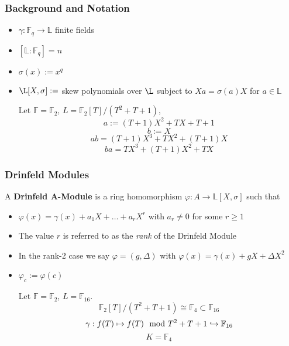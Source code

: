 \documentclass{beamer}
\newcommand{\F}{\mathbb{F}}
\newcommand{\f}{\mathbb{F}}
\begin{document}
\begin{frame}
\frametitle{Background and Notation}

\begin{itemize}

\item $\gamma: \mathbb{F}_q \to \mathbb{L}$ finite fields
\item $[\mathbb{L} : \F_q] = n$
\item $\sigma(x) := x^q$
\item $\L[X,\sigma] := $ skew polynomials over $\L$ subject to $Xa = \sigma(a)X$ for $a \in \mathbb{L}$ 

\begin{example}
Let $\mathbb{F} = \f_2$, $L = \f_2[T]/(T^2 + T + 1)$, %
\[ a:= (T + 1)X^2 + TX + T + 1 \]
\[b := X\]
\[ab = (T + 1)X^3 + TX^2 + (T + 1)X\]
\[ba = TX^3 + (T+1)X^2 + TX \]
\end{example}


\end{itemize}


\end{frame}












\begin{frame}
\frametitle{Drinfeld Modules}

\begin{definition}
A \textbf{Drinfeld A-Module} is a ring homomorphism $\varphi: A \to \mathbb{L}[X,\sigma]$ such that 

\begin{itemize}
    \item $\varphi(x) = \gamma(x) + a_1X + \ldots + a_rX^r$ with $a_r \neq 0$ for some $r \geq 1$
\end{itemize}
\end{definition}

\begin{itemize}
    \item The value $r$ is referred to as the \textit{rank} of the Drinfeld Module
        \item In the rank-2 case we say $\varphi = (g, \Delta)$ with $\varphi(x) = \gamma(x) + gX + \Delta X^2$
        \item 
 $\varphi_c := \varphi(c)$
   \begin{example}
   Let $\f = \f_2$, $L = \mathbb{F}_{16}$.
   \[ \f_2[T]/(T^2 + T + 1) \cong \f_4 \subset \f_{16}\]
   \[ \gamma : f(T) \mapsto f(T) \mod T^2 + T + 1 \xhookrightarrow{} \f_{16} \]
   \[K = \f_4\]
   \end{example}
\end{itemize}

\end{frame}
\end{document}
